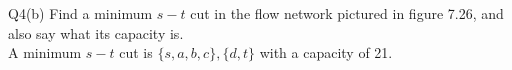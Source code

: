 \begin{problem}
  {Q4(b)}
  Find a minimum $s-t$ cut in the flow network pictured in figure 7.26, and also say what its capacity is. \\
  A minimum $s-t$ cut is $\{s, a, b, c\}, \{d, t\}$ with a capacity of 21. \\
\end{problem}
